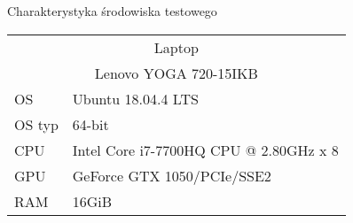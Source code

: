\begin{easyappendix}{Charakterystyka środowiska testowego}

    \begin{tabular}{ |p{2cm}||p{10cm}|  }
        \hline
        \multicolumn{2}{|c|}{Laptop} \\
        \multicolumn{2}{|c|}{Lenovo YOGA 720-15IKB} \\
        \hline
        OS & Ubuntu 18.04.4 LTS\\
        OS typ & 64-bit\\
        CPU & Intel Core i7-7700HQ CPU @ 2.80GHz x 8\\
        GPU & GeForce GTX 1050/PCIe/SSE2\\
        RAM & 16GiB\\
        \hline
    \end{tabular}

\end{easyappendix}

